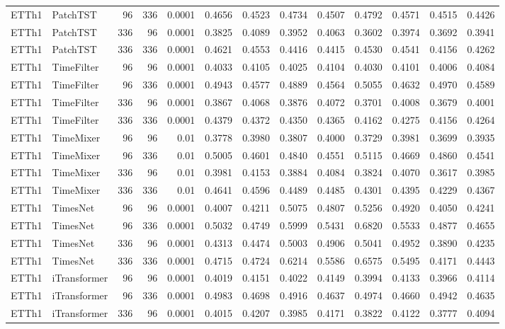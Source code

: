 \begin{longtable}{@{}llrrr*{8}{r}@{}}
ETTh1 & PatchTST & 96 & 336 & 0.0001 & 0.4656 & 0.4523 & 0.4734 & 0.4507 & 0.4792 & 0.4571 & 0.4515 & 0.4426 \\
ETTh1 & PatchTST & 336 & 96 & 0.0001 & 0.3825 & 0.4089 & 0.3952 & 0.4063 & 0.3602 & 0.3974 & 0.3692 & 0.3941 \\
ETTh1 & PatchTST & 336 & 336 & 0.0001 & 0.4621 & 0.4553 & 0.4416 & 0.4415 & 0.4530 & 0.4541 & 0.4156 & 0.4262 \\
ETTh1 & TimeFilter & 96 & 96 & 0.0001 & 0.4033 & 0.4105 & 0.4025 & 0.4104 & 0.4030 & 0.4101 & 0.4006 & 0.4084 \\
ETTh1 & TimeFilter & 96 & 336 & 0.0001 & 0.4943 & 0.4577 & 0.4889 & 0.4564 & 0.5055 & 0.4632 & 0.4970 & 0.4589 \\
ETTh1 & TimeFilter & 336 & 96 & 0.0001 & 0.3867 & 0.4068 & 0.3876 & 0.4072 & 0.3701 & 0.4008 & 0.3679 & 0.4001 \\
ETTh1 & TimeFilter & 336 & 336 & 0.0001 & 0.4379 & 0.4372 & 0.4350 & 0.4365 & 0.4162 & 0.4275 & 0.4156 & 0.4264 \\
ETTh1 & TimeMixer & 96 & 96 & 0.01 & 0.3778 & 0.3980 & 0.3807 & 0.4000 & 0.3729 & 0.3981 & 0.3699 & 0.3935 \\
ETTh1 & TimeMixer & 96 & 336 & 0.01 & 0.5005 & 0.4601 & 0.4840 & 0.4551 & 0.5115 & 0.4669 & 0.4860 & 0.4541 \\
ETTh1 & TimeMixer & 336 & 96 & 0.01 & 0.3981 & 0.4153 & 0.3884 & 0.4084 & 0.3824 & 0.4070 & 0.3617 & 0.3985 \\
ETTh1 & TimeMixer & 336 & 336 & 0.01 & 0.4641 & 0.4596 & 0.4489 & 0.4485 & 0.4301 & 0.4395 & 0.4229 & 0.4367 \\
ETTh1 & TimesNet & 96 & 96 & 0.0001 & 0.4007 & 0.4211 & 0.5075 & 0.4807 & 0.5256 & 0.4920 & 0.4050 & 0.4241 \\
ETTh1 & TimesNet & 96 & 336 & 0.0001 & 0.5032 & 0.4749 & 0.5999 & 0.5431 & 0.6820 & 0.5533 & 0.4877 & 0.4655 \\
ETTh1 & TimesNet & 336 & 96 & 0.0001 & 0.4313 & 0.4474 & 0.5003 & 0.4906 & 0.5041 & 0.4952 & 0.3890 & 0.4235 \\
ETTh1 & TimesNet & 336 & 336 & 0.0001 & 0.4715 & 0.4724 & 0.6214 & 0.5586 & 0.6575 & 0.5495 & 0.4171 & 0.4443 \\
ETTh1 & iTransformer & 96 & 96 & 0.0001 & 0.4019 & 0.4151 & 0.4022 & 0.4149 & 0.3994 & 0.4133 & 0.3966 & 0.4114 \\
ETTh1 & iTransformer & 96 & 336 & 0.0001 & 0.4983 & 0.4698 & 0.4916 & 0.4637 & 0.4974 & 0.4660 & 0.4942 & 0.4635 \\
ETTh1 & iTransformer & 336 & 96 & 0.0001 & 0.4015 & 0.4207 & 0.3985 & 0.4171 & 0.3822 & 0.4122 & 0.3777 & 0.4094 \\

\end{longtable}
